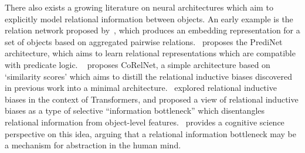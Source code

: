 There also exists a growing literature on neural architectures which aim to explicitly model relational information between objects. An early example is the relation network proposed by~\citet{santoroSimpleNeural2017}, which produces an embedding representation for a set of objects based on aggregated pairwise relations.~\citet{shanahanExplicitlyRelationalNeural} proposes the PrediNet architecture, which aims to learn relational representations which are compatible with predicate logic.
~\citet{kergNeuralArchitecture2022} proposes CoRelNet, a simple architecture based on `similarity scores' which aims to distill the relational inductive biases discovered in previous work into a minimal architecture.~\citet{altabaaAbstractorsRelationalCrossattention2024,altabaa2024disentangling} explored relational inductive biases in the context of Transformers, and proposed a view of relational inductive biases as a type of selective ``information bottleneck'' which disentangles relational information from object-level features.~\citet{webbRelationalBottleneckInductive2023} provides a cognitive science perspective on this idea, arguing that a relational information bottleneck may be a mechanism for abstraction in the human mind.%
